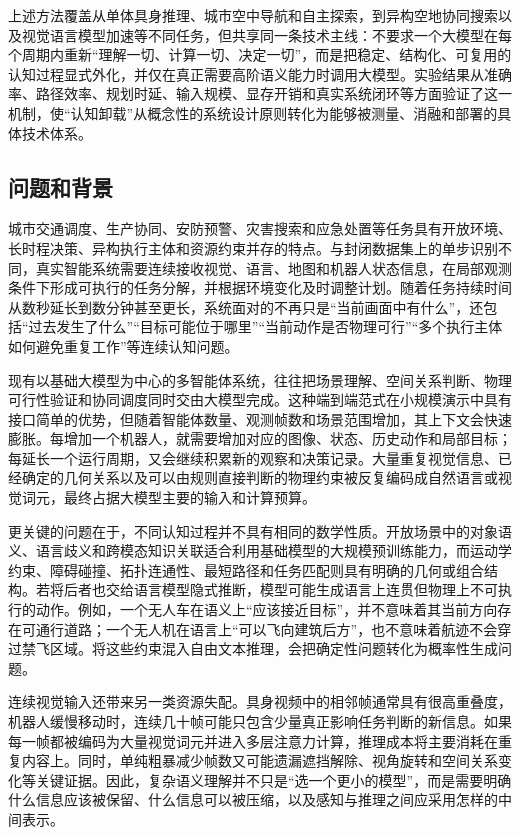 上述方法覆盖从单体具身推理、城市空中导航和自主探索，到异构空地协同搜索以及视觉语言模型加速等不同任务，但共享同一条技术主线：不要求一个大模型在每个周期内重新“理解一切、计算一切、决定一切”，而是把稳定、结构化、可复用的认知过程显式外化，并仅在真正需要高阶语义能力时调用大模型。实验结果从准确率、路径效率、规划时延、输入规模、显存开销和真实系统闭环等方面验证了这一机制，使“认知卸载”从概念性的系统设计原则转化为能够被测量、消融和部署的具体技术体系。

\subsection{问题和背景}
城市交通调度、生产协同、安防预警、灾害搜索和应急处置等任务具有开放环境、长时程决策、异构执行主体和资源约束并存的特点。与封闭数据集上的单步识别不同，真实智能系统需要连续接收视觉、语言、地图和机器人状态信息，在局部观测条件下形成可执行的任务分解，并根据环境变化及时调整计划。随着任务持续时间从数秒延长到数分钟甚至更长，系统面对的不再只是“当前画面中有什么”，还包括“过去发生了什么”“目标可能位于哪里”“当前动作是否物理可行”“多个执行主体如何避免重复工作”等连续认知问题。

现有以基础大模型为中心的多智能体系统，往往把场景理解、空间关系判断、物理可行性验证和协同调度同时交由大模型完成。这种端到端范式在小规模演示中具有接口简单的优势，但随着智能体数量、观测帧数和场景范围增加，其上下文会快速膨胀。每增加一个机器人，就需要增加对应的图像、状态、历史动作和局部目标；每延长一个运行周期，又会继续积累新的观察和决策记录。大量重复视觉信息、已经确定的几何关系以及可以由规则直接判断的物理约束被反复编码成自然语言或视觉词元，最终占据大模型主要的输入和计算预算。

更关键的问题在于，不同认知过程并不具有相同的数学性质。开放场景中的对象语义、语言歧义和跨模态知识关联适合利用基础模型的大规模预训练能力，而运动学约束、障碍碰撞、拓扑连通性、最短路径和任务匹配则具有明确的几何或组合结构。若将后者也交给语言模型隐式推断，模型可能生成语言上连贯但物理上不可执行的动作。例如，一个无人车在语义上“应该接近目标”，并不意味着其当前方向存在可通行道路；一个无人机在语言上“可以飞向建筑后方”，也不意味着航迹不会穿过禁飞区域。将这些约束混入自由文本推理，会把确定性问题转化为概率性生成问题。

连续视觉输入还带来另一类资源失配。具身视频中的相邻帧通常具有很高重叠度，机器人缓慢移动时，连续几十帧可能只包含少量真正影响任务判断的新信息。如果每一帧都被编码为大量视觉词元并进入多层注意力计算，推理成本将主要消耗在重复内容上。同时，单纯粗暴减少帧数又可能遗漏遮挡解除、视角旋转和空间关系变化等关键证据。因此，复杂语义理解并不只是“选一个更小的模型”，而是需要明确什么信息应该被保留、什么信息可以被压缩，以及感知与推理之间应采用怎样的中间表示。

